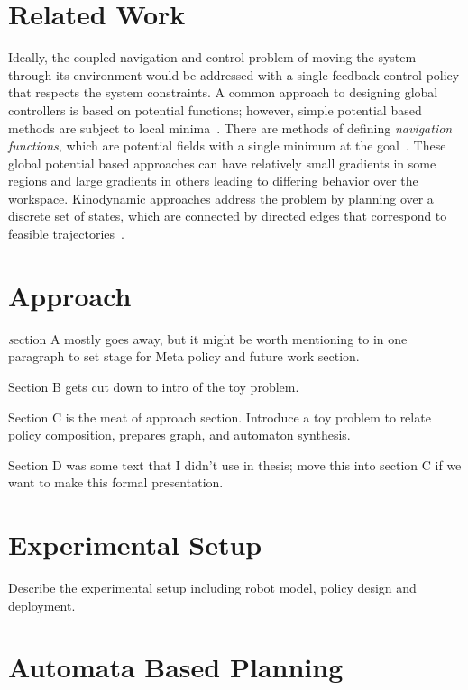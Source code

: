 \documentclass[journal,twoside]{IEEEtran}
\begin{document}
\section{Related Work}

Ideally, the coupled navigation and control problem of moving the
system through its environment would be addressed with a single
feedback control policy that respects the system constraints.  A
common approach to designing global controllers is based on potential
functions; however, simple potential based methods are subject to
local minima~\cite{kod_87}.  There are methods of defining
\emph{navigation functions}, which are potential fields with a single
minimum at the goal~\cite{rim_kod_92,con_grup_93}.  These global
potential based approaches can have relatively small gradients in some
regions and large gradients in others leading to differing behavior
over the workspace.  Kinodynamic approaches address the problem by
planning over a discrete set of states, which are connected by directed edges
that correspond to feasible trajectories~\cite{donald_93}.

\section{Approach}
\label{sec:approach}

{\Large \emph 
section A mostly goes away, but it might be worth mentioning
  to in one paragraph to set stage for Meta policy and future work
  section.

Section B gets cut down to intro of the toy problem.

Section C is the meat of approach section.  Introduce a toy problem to relate policy composition, prepares graph, and automaton synthesis.

Section D was some text that I didn't use in thesis; move this into section C if we want to make this formal presentation.}



\section{Experimental Setup}
\label{sec:setup}

{\large  Describe the experimental setup including robot model, policy design and deployment.}



\section{Automata Based Planning}
\label{sec:planning_detailed}

\end{document}
